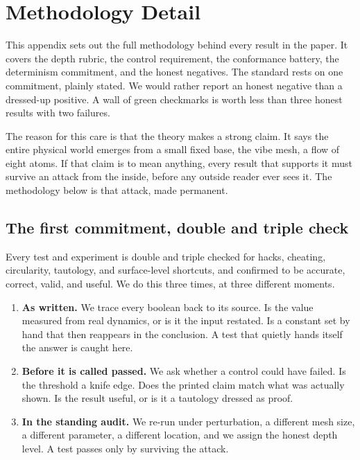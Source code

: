 \section{Methodology Detail}

This appendix sets out the full methodology behind every result in the paper. It covers the depth rubric, the control requirement, the conformance battery, the determinism commitment, and the honest negatives. The standard rests on one commitment, plainly stated. We would rather report an honest negative than a dressed-up positive. A wall of green checkmarks is worth less than three honest results with two failures.

The reason for this care is that the theory makes a strong claim. It says the entire physical world emerges from a small fixed base, the vibe mesh, a flow of eight atoms. If that claim is to mean anything, every result that supports it must survive an attack from the inside, before any outside reader ever sees it. The methodology below is that attack, made permanent.

\subsection{The first commitment, double and triple check}

Every test and experiment is double and triple checked for hacks, cheating, circularity, tautology, and surface-level shortcuts, and confirmed to be accurate, correct, valid, and useful. We do this three times, at three different moments.

\begin{enumerate}
\item \textbf{As written.} We trace every boolean back to its source. Is the value measured from real dynamics, or is it the input restated. Is a constant set by hand that then reappears in the conclusion. A test that quietly hands itself the answer is caught here.
\item \textbf{Before it is called passed.} We ask whether a control could have failed. Is the threshold a knife edge. Does the printed claim match what was actually shown. Is the result useful, or is it a tautology dressed as proof.
\item \textbf{In the standing audit.} We re-run under perturbation, a different mesh size, a different parameter, a different location, and we assign the honest depth level. A test passes only by surviving the attack.
\end{enumerate}

